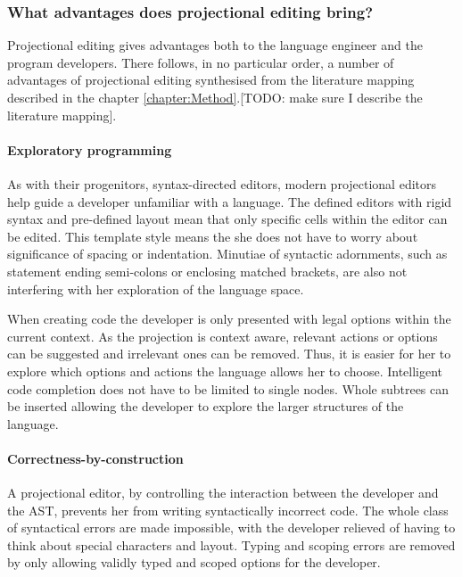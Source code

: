 \subsubsection{What advantages does projectional editing bring?}

Projectional editing gives advantages both to the language engineer and the program developers.
There follows, in no particular order, a number of advantages of projectional editing synthesised from the literature mapping described in the chapter \ref{chapter:Method}.[TODO: make sure I describe the literature mapping].
 
\paragraph{Exploratory programming\cite{klimevs2016domain,ratiu2017experiences,volter2010language,voelter2014towards}}
As with their progenitors, syntax-directed editors, modern projectional editors help guide a developer unfamiliar with a language.
The defined editors with rigid syntax and pre-defined layout mean that only specific cells within the editor can be edited.
This template style means the she does not have to worry about significance of spacing or indentation.
Minutiae of syntactic adornments, such as statement ending semi-colons or enclosing matched brackets, are also not interfering with her exploration of the language space.

When creating code the developer is only presented with legal options within the current context.
As the projection is context aware, relevant actions or options can be suggested and irrelevant ones can be removed.
Thus, it is easier for her to explore which options and actions the language allows her to choose.
Intelligent code completion does not have to be limited to single nodes. 
Whole subtrees can be inserted allowing the developer to explore the larger structures of the language.

\paragraph{Correctness-by-construction}
A projectional editor, by controlling the interaction between the developer and the AST, prevents her from writing syntactically incorrect code.
The whole class of syntactical errors are made impossible, with the developer relieved of having to think about special characters and layout.
Typing and scoping errors are removed by only allowing validly typed and scoped options for the developer.

